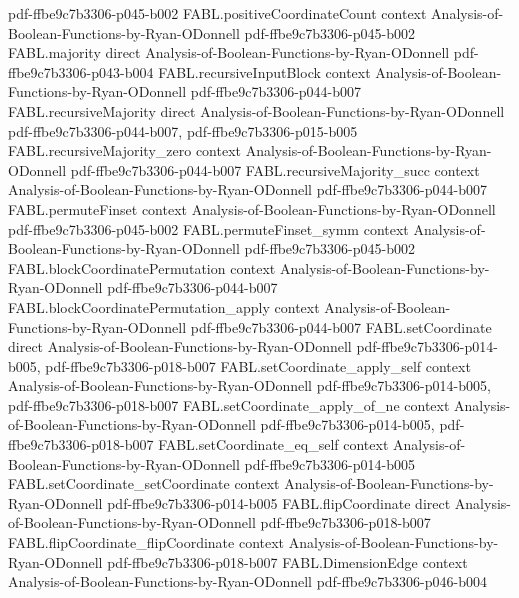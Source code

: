 \begin{theorem}
  {pdf-ffbe9c7b3306-p045-b002}
\proofstep
  {FABL.positiveCoordinateCount}
  {context}
  {Analysis-of-Boolean-Functions-by-Ryan-ODonnell}
  {pdf-ffbe9c7b3306-p045-b002}
\proofstep
  {FABL.majority}
  {direct}
  {Analysis-of-Boolean-Functions-by-Ryan-ODonnell}
  {pdf-ffbe9c7b3306-p043-b004}
\proofstep
  {FABL.recursiveInputBlock}
  {context}
  {Analysis-of-Boolean-Functions-by-Ryan-ODonnell}
  {pdf-ffbe9c7b3306-p044-b007}
\proofstep
  {FABL.recursiveMajority}
  {direct}
  {Analysis-of-Boolean-Functions-by-Ryan-ODonnell}
  {pdf-ffbe9c7b3306-p044-b007,
    pdf-ffbe9c7b3306-p015-b005}
\proofstep
  {FABL.recursiveMajority_zero}
  {context}
  {Analysis-of-Boolean-Functions-by-Ryan-ODonnell}
  {pdf-ffbe9c7b3306-p044-b007}
\proofstep
  {FABL.recursiveMajority_succ}
  {context}
  {Analysis-of-Boolean-Functions-by-Ryan-ODonnell}
  {pdf-ffbe9c7b3306-p044-b007}
\proofstep
  {FABL.permuteFinset}
  {context}
  {Analysis-of-Boolean-Functions-by-Ryan-ODonnell}
  {pdf-ffbe9c7b3306-p045-b002}
\proofstep
  {FABL.permuteFinset_symm}
  {context}
  {Analysis-of-Boolean-Functions-by-Ryan-ODonnell}
  {pdf-ffbe9c7b3306-p045-b002}
\proofstep
  {FABL.blockCoordinatePermutation}
  {context}
  {Analysis-of-Boolean-Functions-by-Ryan-ODonnell}
  {pdf-ffbe9c7b3306-p044-b007}
\proofstep
  {FABL.blockCoordinatePermutation_apply}
  {context}
  {Analysis-of-Boolean-Functions-by-Ryan-ODonnell}
  {pdf-ffbe9c7b3306-p044-b007}
\proofstep
  {FABL.setCoordinate}
  {direct}
  {Analysis-of-Boolean-Functions-by-Ryan-ODonnell}
  {pdf-ffbe9c7b3306-p014-b005,
    pdf-ffbe9c7b3306-p018-b007}
\proofstep
  {FABL.setCoordinate_apply_self}
  {context}
  {Analysis-of-Boolean-Functions-by-Ryan-ODonnell}
  {pdf-ffbe9c7b3306-p014-b005,
    pdf-ffbe9c7b3306-p018-b007}
\proofstep
  {FABL.setCoordinate_apply_of_ne}
  {context}
  {Analysis-of-Boolean-Functions-by-Ryan-ODonnell}
  {pdf-ffbe9c7b3306-p014-b005,
    pdf-ffbe9c7b3306-p018-b007}
\proofstep
  {FABL.setCoordinate_eq_self}
  {context}
  {Analysis-of-Boolean-Functions-by-Ryan-ODonnell}
  {pdf-ffbe9c7b3306-p014-b005}
\proofstep
  {FABL.setCoordinate_setCoordinate}
  {context}
  {Analysis-of-Boolean-Functions-by-Ryan-ODonnell}
  {pdf-ffbe9c7b3306-p014-b005}
\proofstep
  {FABL.flipCoordinate}
  {direct}
  {Analysis-of-Boolean-Functions-by-Ryan-ODonnell}
  {pdf-ffbe9c7b3306-p018-b007}
\proofstep
  {FABL.flipCoordinate_flipCoordinate}
  {context}
  {Analysis-of-Boolean-Functions-by-Ryan-ODonnell}
  {pdf-ffbe9c7b3306-p018-b007}
\proofstep
  {FABL.DimensionEdge}
  {context}
  {Analysis-of-Boolean-Functions-by-Ryan-ODonnell}
  {pdf-ffbe9c7b3306-p046-b004}
\proofstep

\end{theorem}
